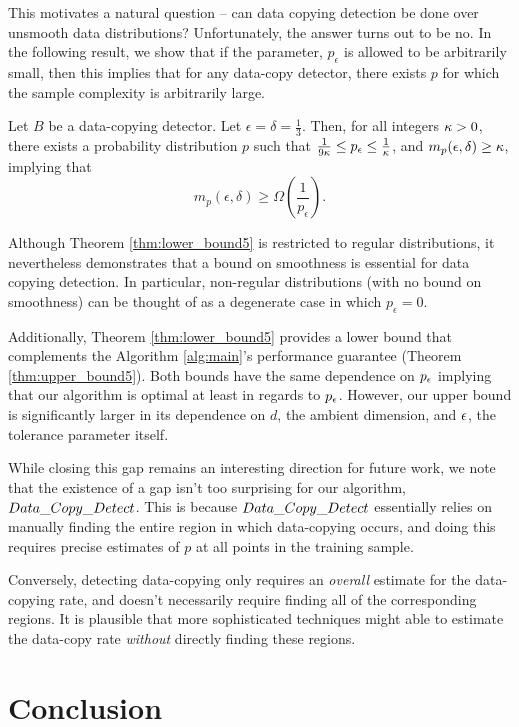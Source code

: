 This motivates a natural question -- can data copying detection be done over unsmooth data distributions? Unfortunately, the answer turns out to be no. In the following result, we show that if the parameter, $p_\epsilon$ is allowed to be arbitrarily small, then this implies that for any data-copy detector, there exists $p$ for which the sample complexity is arbitrarily large.

\begin{theorem}\label{thm:lower_bound5}
Let $B$ be a data-copying detector. Let $\epsilon = \delta = \frac{1}{3}$. Then, for all integers $\kappa > 0$, there exists a probability distribution $p$ such that $\frac{1}{9\kappa} \leq p_\epsilon \leq \frac{1}{\kappa}$, and $m_p(\epsilon, \delta) \geq \kappa$, implying that $$m_p(\epsilon, \delta) \geq \Omega\left(\frac{1}{p_\epsilon}\right).$$
\end{theorem}

Although Theorem \ref{thm:lower_bound5} is restricted to regular distributions, it nevertheless demonstrates that a bound on smoothness is essential for data copying detection. In particular, non-regular distributions (with no bound on smoothness) can be thought of as a degenerate case in which $p_\epsilon = 0$. 

Additionally, Theorem \ref{thm:lower_bound5} provides a lower bound that complements the Algorithm \ref{alg:main}'s performance guarantee (Theorem \ref{thm:upper_bound5}). Both bounds have the same dependence on $p_\epsilon$ implying that our algorithm is optimal at least in regards to $p_\epsilon$. However, our upper bound is significantly larger in its dependence on $d$, the ambient dimension, and $\epsilon$, the tolerance parameter itself. 

While closing this gap remains an interesting direction for future work, we note that the existence of a gap isn't too surprising for our algorithm, $Data\_Copy\_Detect{}$. This is because $Data\_Copy\_Detect{}$ essentially relies on manually finding the entire region in which data-copying occurs, and doing this requires precise estimates of $p$ at all points in the training sample.  

Conversely, detecting data-copying only requires an \textit{overall} estimate for the data-copying rate, and doesn't necessarily require finding all of the corresponding regions. It is plausible that more sophisticated techniques might able to estimate the data-copy rate \textit{without} directly finding these regions.

\section{Conclusion}

